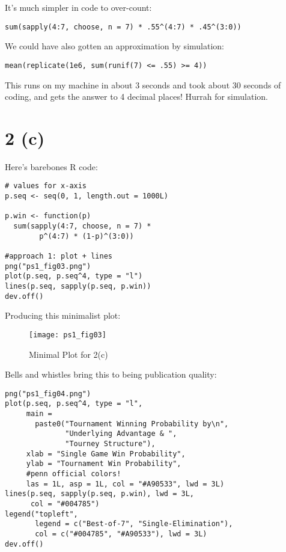 \documentclass{article}
\begin{document}
It's much simpler in code to over-count:

\begin{lstlisting}
sum(sapply(4:7, choose, n = 7) * .55^(4:7) * .45^(3:0))
\end{lstlisting}

We could have also gotten an approximation by simulation:

\begin{lstlisting}
mean(replicate(1e6, sum(runif(7) <= .55) >= 4))
\end{lstlisting}

This runs on my machine in about 3 seconds and took about 30 seconds of coding, and gets the answer to 4 decimal places! Hurrah for simulation.

\section{2 (c)} 

Here's barebones R code:

\begin{lstlisting}
# values for x-axis
p.seq <- seq(0, 1, length.out = 1000L)

p.win <- function(p) 
  sum(sapply(4:7, choose, n = 7) *
        p^(4:7) * (1-p)^(3:0))

#approach 1: plot + lines
png("ps1_fig03.png")
plot(p.seq, p.seq^4, type = "l")
lines(p.seq, sapply(p.seq, p.win))
dev.off()
\end{lstlisting}

Producing this minimalist plot:

\begin{figure}[htbp]
\centering
\texttt{[image: ps1\_fig03]}
\caption{Minimal Plot for 2(c)}
\label{fig:prob}
\end{figure}

Bells and whistles bring this to being publication quality:

\begin{lstlisting}
png("ps1_fig04.png")
plot(p.seq, p.seq^4, type = "l",
     main = 
       paste0("Tournament Winning Probability by\n",
              "Underlying Advantage & ", 
              "Tourney Structure"),
     xlab = "Single Game Win Probability",
     ylab = "Tournament Win Probability",
     #penn official colors!
     las = 1L, asp = 1L, col = "#A90533", lwd = 3L)
lines(p.seq, sapply(p.seq, p.win), lwd = 3L,
      col = "#004785")
legend("topleft", 
       legend = c("Best-of-7", "Single-Elimination"),
       col = c("#004785", "#A90533"), lwd = 3L)
dev.off()
\end{lstlisting}
\end{document}
